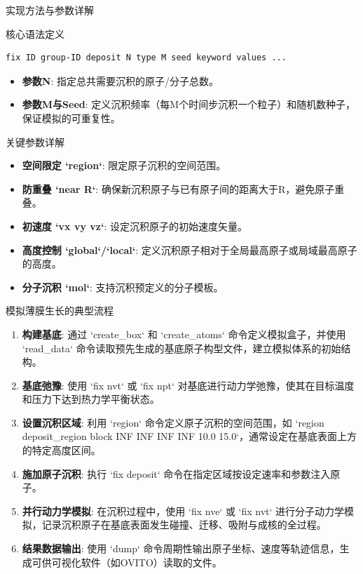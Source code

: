 \documentclass{beamer}
\begin{document}
\begin{frame}{实现方法与参数详解}
    \begin{block}{核心语法定义}
\begin{lstlisting}
fix ID group-ID deposit N type M seed keyword values ...
\end{lstlisting}
        \begin{itemize}
            \item \textbf{参数N}: 指定总共需要沉积的原子/分子总数。
            \item \textbf{参数M与Seed}: 定义沉积频率（每M个时间步沉积一个粒子）和随机数种子，保证模拟的可重复性。
        \end{itemize}
    \end{block}
    \begin{block}{关键参数详解}
        \begin{itemize}
            \item \textbf{空间限定 `region`}: 限定原子沉积的空间范围。
            \item \textbf{防重叠 `near R`}: 确保新沉积原子与已有原子间的距离大于R，避免原子重叠。
            \item \textbf{初速度 `vx vy vz`}: 设定沉积原子的初始速度矢量。
            \item \textbf{高度控制 `global`/`local`}: 定义沉积原子相对于全局最高原子或局域最高原子的高度。
            \item \textbf{分子沉积 `mol`}: 支持沉积预定义的分子模板。
        \end{itemize}
    \end{block}
\end{frame}

\begin{frame}{模拟薄膜生长的典型流程}
    \begin{enumerate}
        \item \textbf{构建基底}: 通过 `create_box` 和 `create_atoms` 命令定义模拟盒子，并使用 `read_data` 命令读取预先生成的基底原子构型文件，建立模拟体系的初始结构。
        \item \textbf{基底弛豫}: 使用 `fix nvt` 或 `fix npt` 对基底进行动力学弛豫，使其在目标温度和压力下达到热力学平衡状态。
        \item \textbf{设置沉积区域}: 利用 `region` 命令定义原子沉积的空间范围，如 `region deposit_region block INF INF INF INF 10.0 15.0`，通常设定在基底表面上方的特定高度区间。
        \item \textbf{施加原子沉积}: 执行 `fix deposit` 命令在指定区域按设定速率和参数注入原子。
        \item \textbf{并行动力学模拟}: 在沉积过程中，使用 `fix nve` 或 `fix nvt` 进行分子动力学模拟，记录沉积原子在基底表面发生碰撞、迁移、吸附与成核的全过程。
        \item \textbf{结果数据输出}: 使用 `dump` 命令周期性输出原子坐标、速度等轨迹信息，生成可供可视化软件（如OVITO）读取的文件。
    \end{enumerate}
\end{frame}
\end{document}
